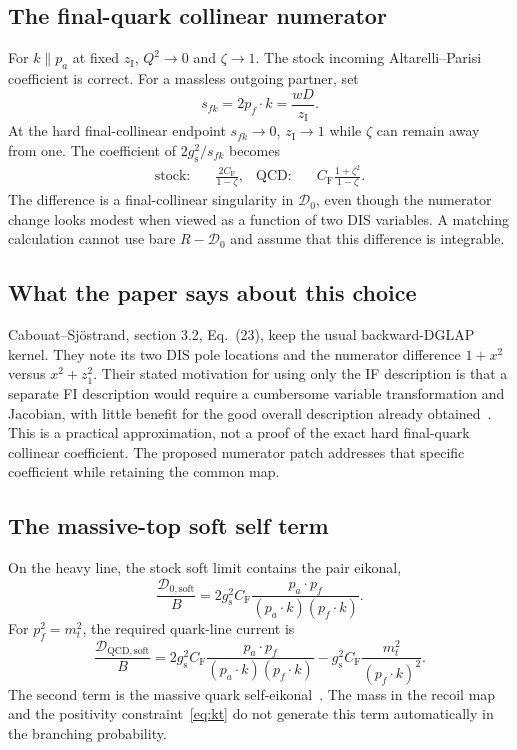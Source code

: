 \documentclass[11pt,a4paper]{article}
\newcommand{\gs}{g_{\mathrm{s}}}
\newcommand{\CF}{C_{\mathrm{F}}}
\newcommand{\zI}{z_{\mathrm{I}}}
\begin{document}
\subsection{The final-quark collinear numerator}

For $k\parallel p_a$ at fixed $\zI$, $Q^2\to0$ and $\zeta\to1$.
The stock incoming Altarelli--Parisi coefficient is correct.
For a massless outgoing partner, set
\begin{equation}
 s_{fk}=2p_f\cdot k=\frac{wD}{\zI}.
\end{equation}
At the hard final-collinear endpoint $s_{fk}\to0$, $\zI\to1$ while $\zeta$
can remain away from one. The coefficient of $2\gs^2/s_{fk}$ becomes
\begin{align}
 \text{stock:}&\quad \frac{2\CF}{1-\zeta},&
 \text{QCD:}&\quad \CF\frac{1+\zeta^2}{1-\zeta}.\label{eq:finalcol}
\end{align}
The difference is a final-collinear singularity in $\mathcal D_0$, even
though the numerator change looks modest when viewed as a function of two
DIS variables. A matching calculation cannot use bare $R-\mathcal D_0$ and
assume that this difference is integrable.

\subsection{What the paper says about this choice}

Cabouat--Sj\"ostrand, section 3.2, Eq.~(23), keep the usual backward-DGLAP
kernel. They note its two DIS pole locations and the numerator difference
$1+x^2$ versus $x^2+z_1^2$. Their stated motivation for using only the IF
description is that a separate FI description would require a cumbersome
variable transformation and Jacobian, with little benefit for the good
overall description already obtained~\cite{Cabouat}. This is a practical
approximation, not a proof of the exact hard final-quark collinear
coefficient. The proposed numerator patch addresses that specific
coefficient while retaining the common map.

\subsection{The massive-top soft self term}

On the heavy line, the stock soft limit contains the pair eikonal,
\begin{equation}
 \frac{\mathcal D_{0,\mathrm{soft}}}{B}
 =2\gs^2\CF\frac{p_a\cdot p_f}
                    {(p_a\cdot k)(p_f\cdot k)}.
\end{equation}
For $p_f^2=m_t^2$, the required quark-line current is
\begin{equation}
 \boxed{\frac{\mathcal D_{\mathrm{QCD,soft}}}{B}
 =2\gs^2\CF\frac{p_a\cdot p_f}
                    {(p_a\cdot k)(p_f\cdot k)}
  -\gs^2\CF\frac{m_t^2}{(p_f\cdot k)^2}.}\label{eq:softcurrent}
\end{equation}
The second term is the massive quark self-eikonal~\cite{MassiveDipoles}.
The mass in the recoil map and the positivity constraint~\eqref{eq:kt} do
not generate this term automatically in the branching probability.
\end{document}
